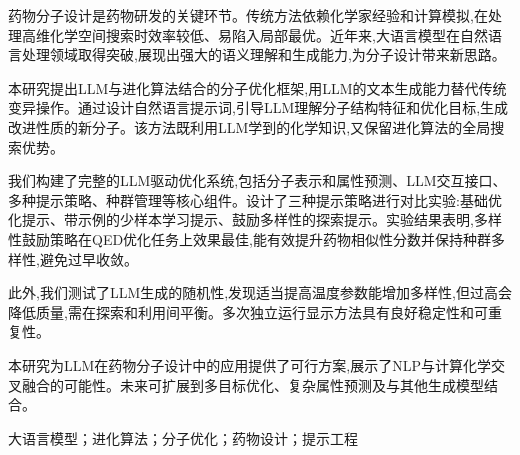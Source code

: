 \begin{abstractCN}
药物分子设计是药物研发的关键环节。传统方法依赖化学家经验和计算模拟,在处理高维化学空间搜索时效率较低、易陷入局部最优。近年来,大语言模型在自然语言处理领域取得突破,展现出强大的语义理解和生成能力,为分子设计带来新思路。

本研究提出LLM与进化算法结合的分子优化框架,用LLM的文本生成能力替代传统变异操作。通过设计自然语言提示词,引导LLM理解分子结构特征和优化目标,生成改进性质的新分子。该方法既利用LLM学到的化学知识,又保留进化算法的全局搜索优势。

我们构建了完整的LLM驱动优化系统,包括分子表示和属性预测、LLM交互接口、多种提示策略、种群管理等核心组件。设计了三种提示策略进行对比实验:基础优化提示、带示例的少样本学习提示、鼓励多样性的探索提示。实验结果表明,多样性鼓励策略在QED优化任务上效果最佳,能有效提升药物相似性分数并保持种群多样性,避免过早收敛。

此外,我们测试了LLM生成的随机性,发现适当提高温度参数能增加多样性,但过高会降低质量,需在探索和利用间平衡。多次独立运行显示方法具有良好稳定性和可重复性。

本研究为LLM在药物分子设计中的应用提供了可行方案,展示了NLP与计算化学交叉融合的可能性。未来可扩展到多目标优化、复杂属性预测及与其他生成模型结合。

\keywordsCN 大语言模型；进化算法；分子优化；药物设计；提示工程
\end{abstractCN}

